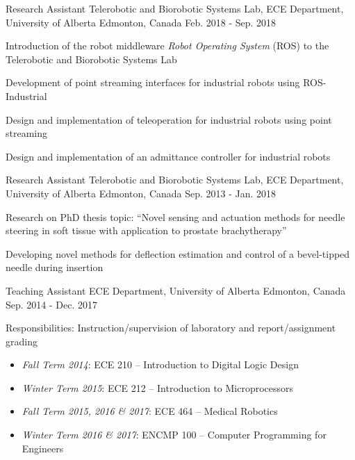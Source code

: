 \begin{cventries}
  \cventry
    {Research Assistant} %
    {Telerobotic and Biorobotic Systems Lab, ECE Department, University of Alberta} %
    {Edmonton, Canada} %
    {Feb. 2018 - Sep. 2018} %
    {
      \begin{cvitems}
        \item {Introduction of the robot middleware \emph{Robot Operating System} (ROS) to the Telerobotic and Biorobotic Systems Lab}
        \item {Development of point streaming interfaces for industrial robots using ROS-Industrial}
        \item {Design and implementation of teleoperation for industrial robots using point streaming}
        \item {Design and implementation of an admittance controller for industrial robots}
      \end{cvitems}
    }

  \cventry
    {Research Assistant} %
    {Telerobotic and Biorobotic Systems Lab, ECE Department, University of Alberta} %
    {Edmonton, Canada} %
    {Sep. 2013 - Jan. 2018} %
    {
      \begin{cvitems} %
        \item{Research on PhD thesis topic: ``Novel sensing and actuation methods for needle steering in soft tissue with application to prostate brachytherapy''}
        \item{Developing novel methods for deflection estimation and control of a bevel-tipped needle during insertion}
      \end{cvitems}
    }

  \cventry
    {Teaching Assistant} %
    {ECE Department, University of Alberta} %
    {Edmonton, Canada} %
    {Sep. 2014 - Dec. 2017} %
    {
      \begin{cvitems}
        \item {Responsibilities: Instruction/supervision of laboratory and report/assignment grading}
        \begin{itemize}
          \item {\emph{Fall Term 2014}: ECE 210 -- Introduction to Digital Logic Design}
          \item {\emph{Winter Term 2015}: ECE 212 -- Introduction to Microprocessors}
          \item {\emph{Fall Term 2015, 2016 \& 2017}: ECE 464 -- Medical Robotics}
          \item {\emph{Winter Term 2016 \& 2017}: ENCMP 100 -- Computer Programming for Engineers}
        \end{itemize}
      \end{cvitems}
    }


\end{cventries}
